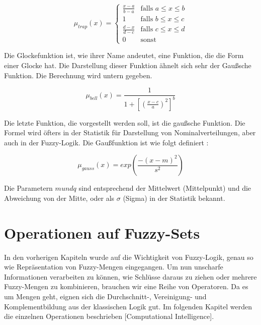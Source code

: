 \begin{equation}
\mu_{trap}(x) = \begin{cases}
\frac{x - a}{b - a} & \text{falls $a \leq x \leq b$}\\
1 & \text{falls $b \leq x \leq c$}\\
\frac{d - x}{d - c} & \text{falls $c \leq x \leq d$}\\
0 & \text{sonst}

\label{trap_mf}
\end{cases}
\end{equation}

Die Glockefunktion ist, wie ihrer Name andeutet, eine Funktion, die die Form einer Glocke hat. Die Darstellung dieser Funktion ähnelt sich sehr der Gaußsche Funktion. Die Berechnung wird untern gegeben. 

\begin{equation}
\mu_{bell}(x) = \frac{1}{1 + [(\frac{x - c}{a})^2]^b}
\label{bell_mf}
\end{equation}

Die letzte Funktion, die vorgestellt werden soll, ist die gaußsche Funktion. Die Formel wird öfters in der Statistik für Darstellung von Nominalverteilungen, aber auch in der Fuzzy-Logik. Die Gaußfunktion ist wie folgt definiert \cite{CIKruse:15}:

\begin{equation}
	\mu_{gauss}(x) = exp(\frac{-(x - m)^2}{s^2})
	\label{gauss_mf}
\end{equation}

Die Parametern $m und q$ sind entsprechend der Mittelwert (Mittelpunkt) und die Abweichung von der Mitte, oder als $\sigma$ (Sigma) in der Statistik bekannt.




%
%

\section{Operationen auf Fuzzy-Sets}
In den vorherigen Kapiteln wurde auf die Wichtigkeit von Fuzzy-Logik, genau so wie Repräsentation von Fuzzy-Mengen eingegangen. Um nun unscharfe Informationen verarbeiten zu können, wie Schlüsse daraus zu ziehen oder mehrere Fuzzy-Mengen zu kombinieren, brauchen wir eine Reihe von Operatoren. Da es um Mengen geht, eignen sich die Durchschnitt-, Vereinigung- und Komplementbildung aus der klassischen Logik gut. Im folgenden Kapitel werden die einzelnen Operationen beschrieben [Computational Intelligence].

